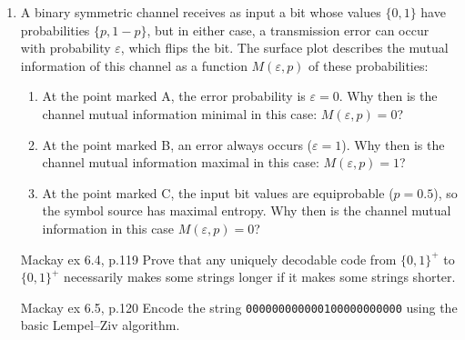 \documentclass[11pt,a4paper]{article}
\begin{document}
\begin{enumerate}
    \item A binary symmetric channel receives as input a bit whose values $\{0,1\}$ have probabilities $\{p, 1-p\}$, but in either case, a transmission error can occur with probability $\varepsilon$, which flips the bit.  
    The surface plot describes the mutual information of this channel as a function $M(\varepsilon, p)$ of these probabilities:
    \begin{enumerate}
        \item At the point marked A, the error probability is $\varepsilon = 0$.  
        Why then is the channel mutual information minimal in this case: $M(\varepsilon, p) = 0$?

        \item At the point marked B, an error always occurs ($\varepsilon = 1$).  
        Why then is the channel mutual information maximal in this case: $M(\varepsilon, p) = 1$?

        \item At the point marked C, the input bit values are equiprobable ($p = 0.5$), so the symbol source has maximal entropy.  
        Why then is the channel mutual information in this case $M(\varepsilon, p) = 0$?
    \end{enumerate}

    \item [Mackay ex 6.4, p.119] Prove that any uniquely decodable code from $\{0,1\}^+$ to $\{0,1\}^+$ necessarily makes some strings longer if it makes some strings shorter.

    \item [Mackay ex 6.5, p.120] Encode the string \verb|000000000000100000000000| using the basic Lempel–Ziv algorithm.
\end{enumerate}
\end{document}

